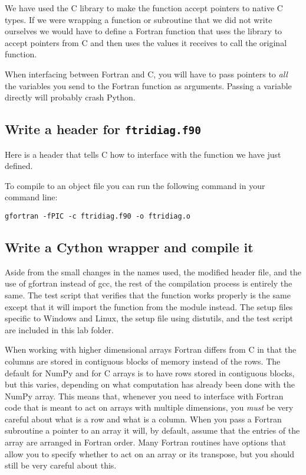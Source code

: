 We have used the C library  to make the function accept pointers to native C types.
If we were wrapping a function or subroutine that we did not write ourselves we would have to define a Fortran function that uses the  library to accept pointers from C and then uses the values it receives to call the original function.


\begin{warn}
When interfacing between Fortran and C, you will have to pass pointers to \emph{all} the variables you send to the Fortran function as arguments.
Passing a variable directly will probably crash Python.
\end{warn}

\subsection*{Write a header for \texttt{ftridiag.f90}}
Here is a header that tells C how to interface with the function we have just defined.


To compile  to an object file you can run the following command in your command line:
\begin{lstlisting}[style=ShellInput]
gfortran -fPIC -c ftridiag.f90 -o ftridiag.o
\end{lstlisting}

\subsection*{Write a Cython wrapper and compile it}

Aside from the small changes in the names used, the modified header file, and the use of gfortran instead of gcc, the rest of the compilation process is entirely the same.
The test script that verifies that the function works properly is the same except that it will import the function from the module  instead.
The setup files specific to Windows and Linux, the setup file using distutils, and the test script are included in this lab folder.

\begin{warn}
When working with higher dimensional arrays Fortran differs from C in that the columns are stored in contiguous blocks of memory instead of the rows.
The default for NumPy and for C arrays is to have rows stored in contiguous blocks, but this varies, depending on what computation has already been done with the NumPy array.
This means that, whenever you need to interface with Fortran code that is meant to act on arrays with multiple dimensions, you \emph{must} be very careful about what is a row and what is a column.
When you pass a Fortran subroutine a pointer to an array it will, by default, assume that the entries of the array are arranged in Fortran order.
Many Fortran routines have options that allow you to specify whether to act on an array or its transpose, but you should still be very careful about this.
\end{warn}

